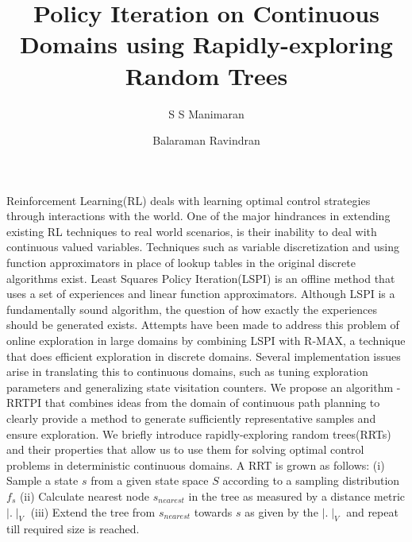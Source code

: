 \documentclass[12pt,a4paper]{article}
\author{\vspace{-0.3in}S S Manimaran \and Balaraman Ravindran}
\title{\vspace{-2.1in}Policy Iteration on Continuous Domains using Rapidly-exploring Random Trees }
\date{}
\begin{document}
\maketitle
\vspace{-0.3in}
Reinforcement Learning(RL) deals with learning optimal control strategies through interactions with the world. One of the major hindrances in extending existing RL techniques to real world scenarios, is their inability to deal with continuous valued variables. Techniques such as variable discretization and using function approximators in place of lookup tables in the original discrete algorithms exist. Least Squares Policy Iteration(LSPI) \cite{lspi} is an offline method that uses a set of experiences and linear function approximators. Although LSPI is a fundamentally sound algorithm, the question of how exactly the experiences should be generated exists. Attempts have been made to address this problem of online exploration in large domains by combining LSPI with R-MAX, a technique that does efficient exploration in discrete domains\cite{rmaxlspi}. Several implementation issues arise in translating this to continuous domains, such as tuning exploration parameters and generalizing state visitation counters. We propose an algorithm - RRTPI that combines ideas from the domain of continuous path planning to clearly provide a method to generate sufficiently representative samples and ensure exploration. We briefly introduce rapidly-exploring random trees(RRTs)\cite{rrt} and their properties that allow us to use them for solving optimal control problems in deterministic continuous domains. A RRT is grown as follows: (i) Sample a state $s$ from a given state space $S$ according to a sampling distribution $f_s$ (ii) Calculate nearest node $s_{nearest}$ in the tree as measured by a distance metric $\mid . \mid_{V}$ (iii) Extend the tree from $s_{nearest}$ towards $s$ as given by the $\mid . \mid_{V}$ and repeat till required size is reached.
\end{document}
